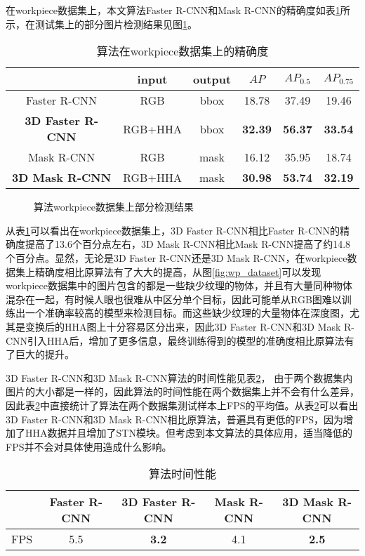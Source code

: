 在workpiece数据集上，本文算法Faster R-CNN和Mask R-CNN的精确度如表\ref{tab:ap2}所示，在测试集上的部分图片检测结果见图\ref{fig:wp_res}。
\begin{table}[ht]
  \centering
  \caption{算法在workpiece数据集上的精确度}
    \begin{tabular}{cccccc}
      \toprule
      &input&output&$AP$&$AP_{0.5}$&$AP_{0.75}$ \\
      \midrule
      Faster R-CNN&RGB&bbox&18.78&37.49&19.46 \\
      \bf{3D Faster R-CNN}&RGB+HHA&bbox&\bf{32.39}&\bf{56.37}&\bf{33.54} \\
      Mask R-CNN&RGB&mask&16.12&35.95&18.74 \\
      \bf{3D Mask R-CNN}&RGB+HHA&mask&\bf{30.98}&\bf{53.74}&\bf{32.19} \\
      \bottomrule
    \end{tabular}
  \label{tab:ap2}
\end{table}
\begin{figure}[ht]
  \centering
  \caption{算法workpiece数据集上部分检测结果}
  \label{fig:wp_res}
\end{figure}
从表\ref{tab:ap2}可以看出在workpiece数据集上，3D Faster R-CNN相比Faster R-CNN的精确度提高了13.6个百分点左右，3D Mask R-CNN相比Mask R-CNN提高了约14.8个百分点。显然，无论是3D Faster R-CNN还是3D Mask R-CNN，在workpiece数据集上精确度相比原算法有了大大的提高，从图\ref{fig:wp_dataset}可以发现workpiece数据集中的图片包含的都是一些缺少纹理的物体，并且有大量同种物体混杂在一起，有时候人眼也很难从中区分单个目标，因此可能单从RGB图难以训练出一个准确率较高的模型来检测目标。而这些缺少纹理的大量物体在深度图，尤其是变换后的HHA图上十分容易区分出来，因此3D Faster R-CNN和3D Mask R-CNN引入HHA后，增加了更多信息，最终训练得到的模型的准确度相比原算法有了巨大的提升。

3D Faster R-CNN和3D Mask R-CNN算法的时间性能见表\ref{tab:fps}，
由于两个数据集内图片的大小都是一样的，因此算法的时间性能在两个数据集上并不会有什么差异，因此表\ref{tab:fps}中直接统计了算法在两个数据集测试样本上FPS的平均值。从表\ref{tab:fps}可以看出3D Faster R-CNN和3D Mask R-CNN相比原算法，普遍具有更低的FPS，因为增加了HHA数据并且增加了STN模块。但考虑到本文算法的具体应用，适当降低的FPS并不会对具体使用造成什么影响。
\begin{table}[ht]
  \centering
  \begin{tabular}{ccccc}
    \toprule
    &Faster R-CNN&\bf{3D Faster R-CNN}&Mask R-CNN&\bf{3D Mask R-CNN} \\
    \midrule
    FPS&5.5&\bf{3.2}&4.1&\bf{2.5} \\
    \bottomrule
  \end{tabular}
  \caption{算法时间性能}
  \label{tab:fps}
\end{table}

